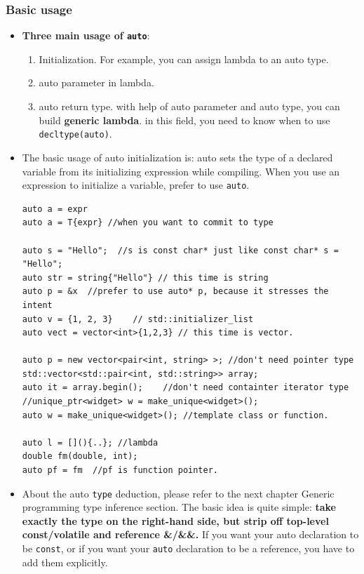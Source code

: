 \documentclass[a4paper,11pt,twoside]{book}
\begin{document}
\subsubsection{Basic usage}
\begin{itemize}
	\item \textbf{Three main usage of \texttt{auto}}:
	\begin{enumerate}
		\item Initialization. For example, you can assign lambda to an auto type.
		\item auto parameter in lambda.
		\item auto return type.  with help of auto parameter and auto type, you can build \textbf{generic lambda}. in this field, you need to know when to use \texttt{decltype(auto)}.
	\end{enumerate}

	\item The basic usage of auto initialization is: auto sets the type of a declared variable from its initializing expression while compiling. When you use an expression to initialize a variable, prefer to use \texttt{auto}.
\begin{lstlisting}[numbers=none]
auto a = expr
auto a = T{expr} //when you want to commit to type

auto s = "Hello";  //s is const char* just like const char* s = "Hello";
auto str = string{"Hello"} // this time is string
auto p = &x  //prefer to use auto* p, because it stresses the intent
auto v = {1, 2, 3}    // std::initializer_list
auto vect = vector<int>{1,2,3} // this time is vector.

auto p = new vector<pair<int, string> >; //don't need pointer type
std::vector<std::pair<int, std::string>> array;
auto it = array.begin();    //don't need containter iterator type
//unique_ptr<widget> w = make_unique<widget>();
auto w = make_unique<widget>(); //template class or function.

auto l = [](){..}; //lambda
double fm(double, int);
auto pf = fm  //pf is function pointer.        
\end{lstlisting}
	
	\item About the auto \texttt{type} deduction, please refer to the next chapter Generic programming type inference section. The basic idea is quite simple: \textbf{take exactly the type on the right-hand side, but strip off top-level const/volatile and reference \&/\&\&.} If you want your auto declaration to be \texttt{const}, or if you want your \texttt{auto} declaration to be a reference, you have to add them explicitly.
	

\end{itemize}
\end{document}
